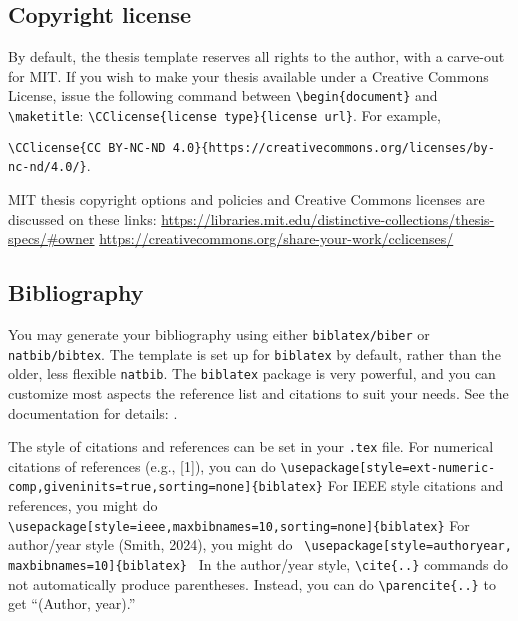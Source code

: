 \documentclass[11pt]{article}
\begin{document}
\subsection{Copyright license}
By default, the thesis template reserves all rights to the author, with a carve-out for MIT.  If you wish to make your thesis available under a Creative Commons License, issue the following command between
\verb|\begin{document}| and \verb|\maketitle|: \verb|\CClicense{license type}{license url}|.  For example,
 
\vskip 5pt
\noindent\quad\verb|\CClicense{CC BY-NC-ND 4.0}{https://creativecommons.org/licenses/by-nc-nd/4.0/}|.

\vskip 5pt
\noindent MIT thesis copyright options and policies and Creative Commons licenses are discussed on these links:
\indent\url{https://libraries.mit.edu/distinctive-collections/thesis-specs/#owner}\newline
\indent\url{https://creativecommons.org/share-your-work/cclicenses/}

\subsection{Bibliography}
You may generate your bibliography using either \texttt{biblatex/biber} or \texttt{natbib/bibtex}.  The template is set up for \texttt{biblatex} by default, rather than the older, less flexible \texttt{natbib}.  The \texttt{biblatex} package is very powerful, and you can customize most aspects the reference list and citations to suit your needs. See the documentation for details: .

The style of citations and references can be set in your \texttt{.tex} file. For numerical citations of references (e.g., [1]), you can do
\vskip 5pt
\verb|\usepackage[style=ext-numeric-comp,giveninits=true,sorting=none]{biblatex}|
\vskip 5pt
\noindent For IEEE style citations and references, you might do
\vskip 5pt
\verb| \usepackage[style=ieee,maxbibnames=10,sorting=none]{biblatex}|
\vskip 5pt
\noindent For author/year style (Smith, 2024), you might do
\vskip 5pt
\verb| \usepackage[style=authoryear, maxbibnames=10]{biblatex} |
\vskip 5pt
\noindent In the author/year style, \verb|\cite{..}| commands do not automatically produce parentheses. Instead, you can do
\verb|\parencite{..}| to get ``(Author, year).''
\end{document}
